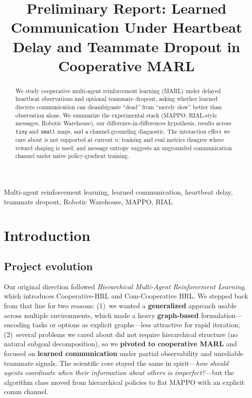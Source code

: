 \documentclass[conference,onecolumn]{IEEEtran}
\title{Preliminary Report: Learned Communication Under Heartbeat Delay and Teammate Dropout in Cooperative MARL}
\author{\IEEEauthorblockN{Sam Chen}
\IEEEauthorblockA{\textit{Harvard University}\\
Cambridge, MA, USA\\
Course: CS 2860 (Multi-Agent Systems)}
\and
\IEEEauthorblockN{Praneel Khiantani}
\IEEEauthorblockA{\textit{Harvard University}\\
Cambridge, MA, USA\\
Course: CS 2860 (Multi-Agent Systems)}
}
\begin{document}
\maketitle

\begin{abstract}
We study cooperative multi-agent reinforcement learning (MARL) under delayed heartbeat observations and optional teammate dropout, asking whether learned discrete communication can disambiguate ``dead'' from ``merely slow'' better than observation alone. We summarize the experimental stack (MAPPO, RIAL-style messages, Robotic Warehouse), our difference-in-differences hypothesis, results across \texttt{tiny} and \texttt{small} maps, and a channel-grounding diagnostic. The interaction effect we care about is not supported at current $n$; training and eval metrics disagree where reward shaping is used; and message entropy suggests an ungrounded communication channel under naive policy-gradient training.
\end{abstract}

\begin{IEEEkeywords}
Multi-agent reinforcement learning, learned communication, heartbeat delay, teammate dropout, Robotic Warehouse, MAPPO, RIAL
\end{IEEEkeywords}

\section{Introduction}

\subsection{Project evolution}

Our original direction followed \emph{Hierarchical Multi-Agent Reinforcement Learning}, which introduces Cooperative-HRL and Com-Cooperative HRL. We stepped back from that line for two reasons: (1)~we wanted a \textbf{generalized} approach usable across multiple environments, which made a heavy \textbf{graph-based} formulation---encoding tasks or options as explicit graphs---less attractive for rapid iteration; (2)~several problems we cared about did not require hierarchical structure (no natural subgoal decomposition), so we \textbf{pivoted to cooperative MARL} and focused on \textbf{learned communication} under partial observability and unreliable teammate signals. The scientific core stayed the same in spirit---\emph{how should agents coordinate when their information about others is imperfect?}---but the algorithm class moved from hierarchical policies to flat MAPPO with an explicit comm channel.
\end{document}
